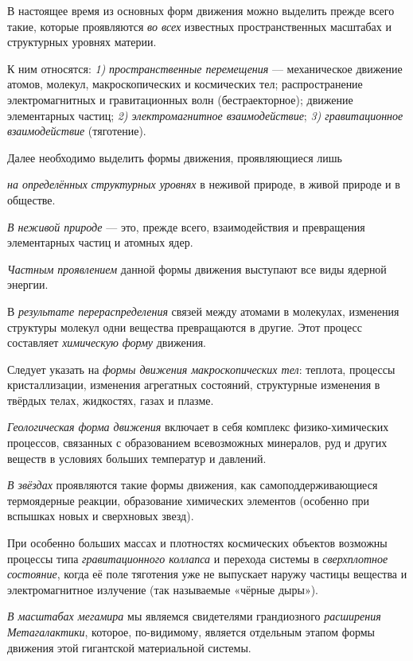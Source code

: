 \documentclass[a4paper,14pt,russian]{extreport}
\begin{document}
В настоящее время из основных форм движения можно выделить прежде всего такие, которые проявляются \emph{во всех} известных пространственных масштабах и структурных уровнях материи.

К ним относятся: \emph{1)} \emph{пространственные перемещения} --- механическое движение атомов, молекул, макроскопических и космических тел; распространение электромагнитных и гравитационных волн (бестраекторное); движение элементарных частиц; \emph{2) электромагнитное взаимодействие}; \emph{3) гравитационное взаимодействие} (тяготение).

Далее необходимо выделить формы движения, проявляющиеся лишь

\emph{на определённых} \emph{структурных уровнях} в неживой природе, в живой природе и в обществе.

\emph{В неживой природе} --- это, прежде всего, взаимодействия и превращения элементарных частиц и атомных ядер.

\emph{Частным проявлением} данной формы движения выступают все виды ядерной энергии.

В \emph{результате перераспределения} связей между атомами в молекулах, изменения структуры молекул одни вещества превращаются в другие. Этот процесс составляет \emph{химическую форму} движения.

Следует указать на \emph{формы движения макроскопических тел}: теплота, процессы кристаллизации, изменения агрегатных состояний, структурные изменения в твёрдых телах, жидкостях, газах и плазме.

\emph{Геологическая форма движения} включает в себя комплекс физико-химических процессов, связанных с образованием всевозможных минералов, руд и других веществ в условиях больших температур и давлений.

\emph{В звёздах} проявляются такие формы движения, как самоподдерживающиеся термоядерные реакции, образование химических элементов (особенно при вспышках новых и сверхновых звезд).

При особенно больших массах и плотностях космических объектов возможны процессы типа \emph{гравитационного коллапса} и перехода системы в \emph{сверхплотное состояние}, когда её поле тяготения уже не выпускает наружу частицы вещества и электромагнитное излучение (так называемые «чёрные дыры»).

\emph{В масштабах мегамира} мы являемся свидетелями грандиозного \emph{расширения Метагалактики}, которое, по-видимому, является отдельным этапом формы движения этой гигантской материальной системы.
\end{document}
